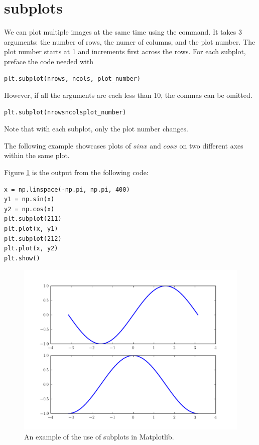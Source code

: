 \section*{subplots}

We can plot multiple images at the same time using the  command. 
It takes 3 arguments: the number of rows, the numer of columns, and the plot number. 
The plot number starts at 1 and increments first across the rows. 
For each subplot, preface the code needed with
\begin{lstlisting}
plt.subplot(nrows, ncols, plot_number)
\end{lstlisting}
However, if all the arguments are each less than 10, the commas can be 
omitted. 
\begin{lstlisting}
plt.subplot(nrowsncolsplot_number)
\end{lstlisting}
Note that with each subplot, only the plot number changes. 

The following example showcases plots of $sin x$ and $cos x$ on two 
different axes within the same plot.

Figure \ref{fig:subplots} is the output from the following code:
\begin{lstlisting}
x = np.linspace(-np.pi, np.pi, 400) 
y1 = np.sin(x) 
y2 = np.cos(x)
plt.subplot(211) 
plt.plot(x, y1) 
plt.subplot(212) 
plt.plot(x, y2)
plt.show() 
\end{lstlisting}

\begin{figure} 
\includegraphics[width=\textwidth]{subplots.pdf}
\caption{An example of the use of subplots in Matplotlib.}
\label{fig:subplots} 
\end{figure}

